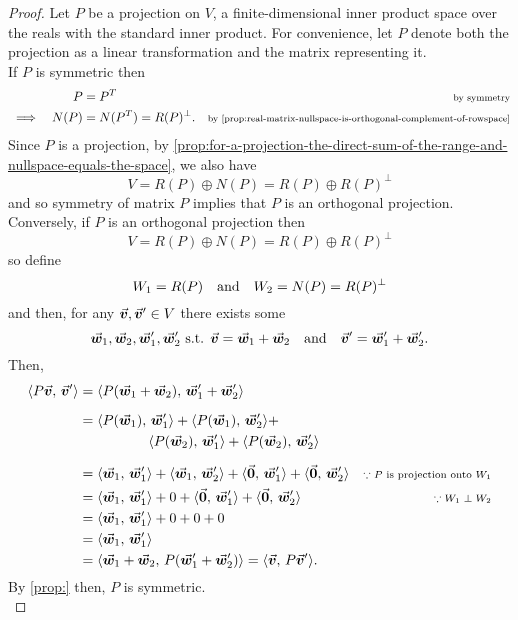 \documentclass[../MathsNotesBase.tex]{subfiles}
\begin{document}
{	\bigskip
	\begin{proof}
		Let $P$ be a projection on $V$, a finite-dimensional inner product space over the reals with the standard inner product. For convenience, let $P$ denote both the projection as a linear transformation and the matrix representing it.\\
		
		If $P$ is symmetric then
		\[\begin{aligned}
			&& P &= P^T &\sidecomment{by symmetry}\\
			&\implies & N(P) &= N(P^T) = R(P)^\perp.  &\sidecomment{by \autoref{prop:real-matrix-nullspace-is-orthogonal-complement-of-rowspace}}
		\end{aligned}\]
		Since $P$ is a projection, by \autoref{prop:for-a-projection-the-direct-sum-of-the-range-and-nullspace-equals-the-space}, we also have
		\[ V = R(P) \oplus N(P) = R(P) \oplus R(P)^\perp \]
		and so symmetry of matrix $P$ implies that $P$ is an orthogonal projection.\\
		
		\nl
		Conversely, if $P$ is an orthogonal projection then
		\[ V = R(P) \oplus N(P) = R(P) \oplus R(P)^\perp \]
		so define 
		\[ W_1 = R(P) \hspace{10pt}\text{and}\hspace{10pt} W_2 = N(P) = R(P)^\perp \]
		and then, for any ${ \vec{\bm{v}},\vec{\bm{v}}' \in V }$ there exists some 
		\[ \vec{\bm{w}}_1,\vec{\bm{w}}_2,\vec{\bm{w}}_1',\vec{\bm{w}}_2' \text{ s.t. } \vec{\bm{v}} = \vec{\bm{w}}_1 + \vec{\bm{w}}_2 \hspace{10pt}\text{and}\hspace{10pt} \vec{\bm{v}}' = \vec{\bm{w}}_1' + \vec{\bm{w}}_2'. \]
		Then,
		\[\begin{aligned}
			\inner{P\v}{\v'} &= \inner{P(\w_1 + \w_2)}{\w_1' + \w_2'} \nn
			&= \inner{P(\w_1)}{\w_1'} + \inner{P(\w_1)}{\w_2'} +\\
			&\hspace{50pt} \inner{P(\w_2)}{\w_1'} + \inner{P(\w_2)}{\w_2'} &\sidecomment{} \nn
			&= \inner{\w_1}{\w_1'} + \inner{\w_1}{\w_2'} + \inner{\0}{\w_1'} + \inner{\0}{\w_2'} &\sidecomment{${ \because P }$ is projection onto $W_1$} \\
			&= \inner{\w_1}{\w_1'} + 0 + \inner{\0}{\w_1'} + \inner{\0}{\w_2'} &\sidecomment{${ \because W_1 \perp W_2 }$} \\
			&= \inner{\w_1}{\w_1'} + 0 + 0 + 0 &\sidecomment{} \\
			&= \inner{\w_1}{\w_1'} \\
			&= \inner{\w_1 + \w_2}{P(\w_1' + \w_2')} = \inner{\v}{P\v'}.
		\end{aligned}\]
		By \autoref{prop:} then, $P$ is symmetric.\\
		

\end{proof}}
\end{document}
